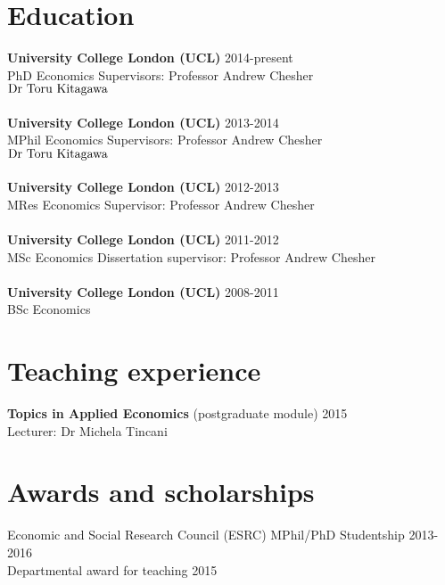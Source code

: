 \documentclass[margin,line]{res}
\begin{document}
\begin{resume}
\section{\sc Education}
\begin{small}
\textbf{University College London (UCL)}								\hfill 2014-present\\
PhD Economics 															\hfill Supervisors: Professor Andrew Chesher\\
\phantom{MPhil Economics}												\hfill $\mathrlap{\text{Dr Toru Kitagawa}}\phantom{\text{Professor Andrew Chesher}}$\\
\\
\textbf{University College London (UCL)}								\hfill 2013-2014\\
MPhil Economics 														\hfill Supervisors: Professor Andrew Chesher\\
\phantom{MPhil Economics}												\hfill $\mathrlap{\text{Dr Toru Kitagawa}}\phantom{\text{Professor Andrew Chesher}}$\\
\\	
\textbf{University College London (UCL)}								\hfill 2012-2013\\
MRes Economics 															\hfill Supervisor: Professor Andrew Chesher\\
\\	
\textbf{University College London (UCL)}								\hfill 2011-2012\\
MSc Economics															\hfill Dissertation supervisor: Professor Andrew Chesher\\
\\
\textbf{University College London (UCL)}								\hfill 2008-2011\\
BSc Economics\\			
\end{small}
\section{\sc Teaching experience}
\begin{small}
\textbf{Topics in Applied Economics} (postgraduate module) 				\hfill 2015\\
																		\hfill Lecturer: Dr Michela Tincani\\
\end{small}																		
\section{\sc Awards and scholarships}
\begin{small}
Economic and Social Research Council (ESRC) MPhil/PhD Studentship		\hfill 2013-2016\\	 
Departmental award for teaching											\hfill 2015\\
\end{small}

\end{resume}
\end{document}
